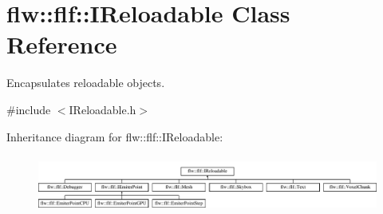 \hypertarget{classflw_1_1flf_1_1IReloadable}{}\section{flw\+:\+:flf\+:\+:I\+Reloadable Class Reference}
\label{classflw_1_1flf_1_1IReloadable}


Encapsulates reloadable objects.  




{\ttfamily \#include $<$I\+Reloadable.\+h$>$}

Inheritance diagram for flw\+:\+:flf\+:\+:I\+Reloadable\+:\begin{figure}[H]
\begin{center}
\leavevmode
\includegraphics[height=1.904762cm]{classflw_1_1flf_1_1IReloadable}
\end{center}
\end{figure}

